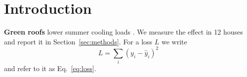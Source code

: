 \section{Introduction}\label{sec:intro}
{\bf Green roofs} lower summer cooling loads \cite{okafor2011}. We measure the effect
in 12 houses and report it in Section~\ref{sec:methods}. For a loss $L$ we write
$$ L = \sum_i (y_i - \hat y_i)^2 $$
and refer to it as Eq.~\eqref{eq:loss}.
